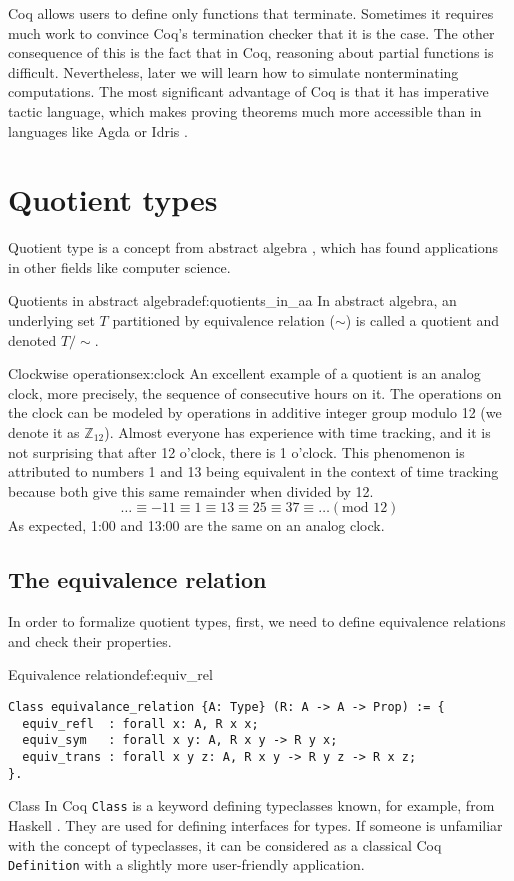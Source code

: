 Coq allows users to define only functions that terminate. Sometimes it requires much work to convince Coq's termination checker that it is the case. The other consequence of this is the fact that in Coq, reasoning about partial functions is difficult. Nevertheless, later we will learn how to simulate nonterminating computations. The most significant advantage of Coq is that it has imperative tactic language, which makes proving theorems much more accessible than in languages like Agda \cite{agda} or Idris \cite{idris}.

\section{Quotient types}
Quotient type is a concept from abstract algebra \cite{AbstractAlgebra}, which has found applications in other fields like computer science.
\begin{defi}{Quotients in abstract algebra}{def:quotients_in_aa}
In abstract algebra, an underlying set $T$ partitioned by equivalence relation ($\sim$) is called a quotient and denoted $T/\sim$.
\end{defi}
\begin{example}{Clockwise operations}{ex:clock}
An excellent example of a quotient is an analog clock, more precisely, the sequence of consecutive hours on it. The operations on the clock can be modeled by operations in additive integer group modulo 12 (we denote it as $\mathbb{Z}_{12}$). Almost everyone has experience with time tracking, and it is not surprising that after 12 o'clock, there is 1 o'clock. This phenomenon is attributed to numbers 1 and 13 being equivalent in the context of time tracking because both give this same remainder when divided by 12.
$$ \dots \equiv -11 \equiv 1 \equiv 13 \equiv 25 \equiv 37 \equiv \dots (\textrm{mod } 12) $$
As expected, 1:00 and 13:00 are the same on an analog clock.
\end{example}

\subsection{The equivalence relation}
In order to formalize quotient types, first, we need to define equivalence relations and check their properties.

\begin{defi}{Equivalence relation}{def:equiv_rel}
\begin{verbatim}
Class equivalance_relation {A: Type} (R: A -> A -> Prop) := {
  equiv_refl  : forall x: A, R x x;
  equiv_sym   : forall x y: A, R x y -> R y x;
  equiv_trans : forall x y z: A, R x y -> R y z -> R x z;
}.
\end{verbatim}
\end{defi}
\begin{coq}{Class}{}
In Coq \texttt{Class} is a keyword defining typeclasses known, for example, from Haskell \cite{Haskell}. They are used for defining interfaces for types. If someone is unfamiliar with the concept of typeclasses, it can be considered as a classical Coq \texttt{Definition} with a slightly more user-friendly application.
\end{coq}

